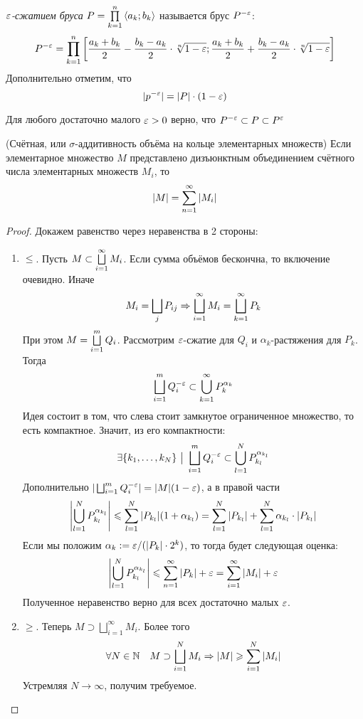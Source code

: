 \begin{definition}
	\textit{$\varepsilon$-сжатием бруса} $P = \prod\limits_{k = 1}^n \left\langle a_k; b_k\right\rangle$ называется брус $P^{-\varepsilon}$:
	\[
		P^{-\varepsilon} = \prod\limits_{k = 1}^n \left[\frac{a_k + b_k}{2} - \frac{b_k - a_k}{2} \cdot \sqrt[n]{1 - \varepsilon}; \frac{a_k + b_k}{2} + \frac{b_k - a_k}{2} \cdot \sqrt[n]{1 - \varepsilon}\right]
	\]
	Дополнительно отметим, что
	\[
		|p^{-\varepsilon}| = |P| \cdot (1 - \varepsilon)
	\]
\end{definition}

\begin{note}
	Для любого достаточно малого $\varepsilon > 0$ верно, что $P^{-\varepsilon} \subset P \subset P^\varepsilon$
\end{note}

\begin{theorem} (Счётная, или $\sigma$-аддитивность объёма на кольце элементарных множеств)
	Если элементарное множество $M$ представлено дизъюнктным объединением счётного числа элементарных множеств $M_i$, то
	\[
		|M| = \sum_{n = 1}^\infty |M_i|
	\]
\end{theorem}

\begin{proof}
	Докажем равенство через неравенства в 2 стороны:
	\begin{enumerate}
		\item $\le$. Пусть $M \subset \bigsqcup\limits_{i = 1}^\infty M_i$. Если сумма объёмов бескончна, то включение очевидно. Иначе
		\[
			M_i = \bigsqcup\limits_j P_{ij} \Rightarrow \bigsqcup\limits_{i = 1}^\infty M_i = \bigsqcup\limits_{k = 1}^\infty P_k
		\]
		При этом $M = \bigsqcup\limits_{i = 1}^m Q_i$. Рассмотрим $\varepsilon$-сжатие для $Q_i$ и $\alpha_k$-растяжения для $P_k$. Тогда
		\[
			\bigsqcup\limits_{i = 1}^m Q_i^{-\varepsilon} \subset \bigcup\limits_{k = 1}^\infty P_k^{\alpha_k}
		\]
		Идея состоит в том, что слева стоит замкнутое ограниченное множество, то есть компактное. Значит, из его компактности:
		\[
			\exists \{k_1, \ldots, k_N\} \ \big|\  \bigsqcup\limits_{i = 1}^m Q_i^{-\varepsilon} \subset \bigcup\limits_{l = 1}^N P_{k_l}^{\alpha_{k_l}}
		\]
		Дополнительно $|\bigsqcup_{i = 1}^m Q_i^{-\varepsilon}| = |M|(1 - \varepsilon)$, а в правой части
		\[
			\left|\bigcup_{l = 1}^N P_{k_l}^{\alpha_{k_l}}\right| \leqslant \sum_{l = 1}^N |P_{k_l}|(1 + \alpha_{k_l}) = \sum\limits_{l = 1}^N |P_{k_l}| + \sum\limits_{l = 1}^N \alpha_{k_l} \cdot |P_{k_l}|
		\]
		Если мы положим $\alpha_k := \varepsilon / (|P_k| \cdot 2^k)$, то тогда будет следующая оценка:
		\[
			\left|\bigcup_{l = 1}^N P_{k_l}^{\alpha_{k_l}}\right| \leqslant \sum_{n = 1}^\infty |P_k| + \varepsilon = \sum\limits_{i = 1}^\infty |M_i| + \varepsilon
		\]
		Полученное неравенство верно для всех достаточно малых $\varepsilon$.
		
		\item $\ge$. Теперь $M \supset \bigsqcup_{i = 1}^\infty M_i$. Более того
		\[
			\forall N \in \mathbb{N} \quad M \supset \bigsqcup_{i = 1}^N M_i \Rightarrow |M| \geqslant \sum\limits_{i = 1}^N |M_i|
		\]
		Устремляя $N \to \infty$, получим требуемое.
	\end{enumerate}
\end{proof}